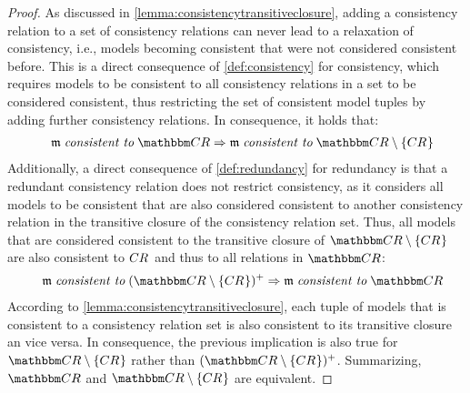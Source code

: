 \begin{proof}
    As discussed in \autoref{lemma:consistencytransitiveclosure}, adding a consistency relation to a set of consistency relations can never lead to a relaxation of consistency, i.e., models becoming consistent that were not considered consistent before. This is a direct consequence of \autoref{def:consistency} for consistency, which requires models to be consistent to all consistency relations in a set to be considered consistent, thus restricting the set of consistent model tuples by adding further consistency relations.
    In consequence, it holds that:
    \begin{align*}
        \formulaskip
        \modeltuple{m} \consistenttomath \consistencyrelationset{CR} \Rightarrow 
        \modeltuple{m} \consistenttomath \consistencyrelationset{CR} \setminus \setted{\consistencyrelation{CR}{}}
    \end{align*}
    Additionally, a direct consequence of \autoref{def:redundancy} for redundancy is that a redundant consistency relation does not restrict consistency, as it considers all models to be consistent that are also considered consistent to another consistency relation in the transitive closure of the consistency relation set. Thus, all models that are considered consistent to the transitive closure of $\consistencyrelationset{CR} \setminus \setted{\consistencyrelation{CR}{}}$ are also consistent to $\consistencyrelation{CR}{}$ and thus to all relations in $\consistencyrelationset{CR}$:
    \begin{align*}
        \formulaskip
        \modeltuple{m} \consistenttomath \transitiveclosure{(\consistencyrelationset{CR} \setminus \setted{\consistencyrelation{CR}{}})} \Rightarrow 
        \modeltuple{m} \consistenttomath \consistencyrelationset{CR}
    \end{align*}
    According to \autoref{lemma:consistencytransitiveclosure}, each tuple of models that is consistent to a consistency relation set is also consistent to its transitive closure an vice versa.
    In consequence, the previous implication is also true for $\consistencyrelationset{CR} \setminus \setted{\consistencyrelation{CR}{}}$ rather than $\transitiveclosure{(\consistencyrelationset{CR} \setminus \setted{\consistencyrelation{CR}{}})}$.
    Summarizing, $\consistencyrelationset{CR}$ and $\consistencyrelationset{CR} \setminus \setted{\consistencyrelation{CR}{}}$ are equivalent.
\end{proof}

